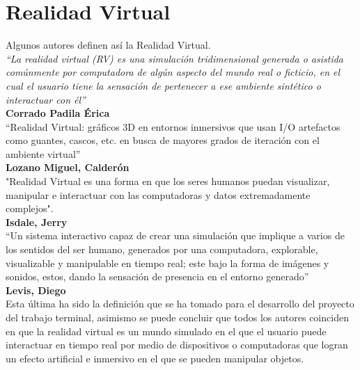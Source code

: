 \section{Realidad Virtual}
Algunos autores definen así la Realidad Virtual.\\
\newline
\textit{“La realidad virtual (RV) es una simulación tridimensional generada o asistida comúnmente por computadora de algún aspecto del mundo real o ficticio, en el cual 
el usuario tiene la sensación de pertenecer a ese ambiente sintético o interactuar con él”}\cite{web6}\\ 
\textbf{Corrado Padila Érica}\\
\newline
“Realidad Virtual: gráficos 3D en entornos inmersivos que usan I/O
artefactos como guantes, cascos, etc. en busca de mayores grados de iteración
con el ambiente virtual”\cite{web7}\\ 
\textbf{Lozano Miguel, Calderón}\\
\newline
"Realidad Virtual es una forma en que los seres humanos puedan
visualizar, manipular e interactuar con las computadoras y datos extremadamente
complejos".\cite{web8}\\
\textbf{Isdale, Jerry}\\
\newline
“Un sistema interactivo capaz de crear una simulación que implique a varios de los sentidos del ser humano, generados por una computadora, explorable, visualizable y manipulable 
en tiempo real; este bajo la forma de imágenes y sonidos, estos, dando la sensación de presencia en el entorno generado”\cite{web9}\\
\textbf{Levis, Diego}\\
\newline
Esta última ha sido la definición que se ha tomado para el desarrollo del proyecto del trabajo terminal, asimismo se puede concluir que todos los autores coinciden en que la 
realidad virtual es un mundo simulado en el que el usuario puede interactuar en tiempo real por medio
de dispositivos o computadoras que logran un efecto artificial e inmersivo en el que se pueden manipular objetos.

